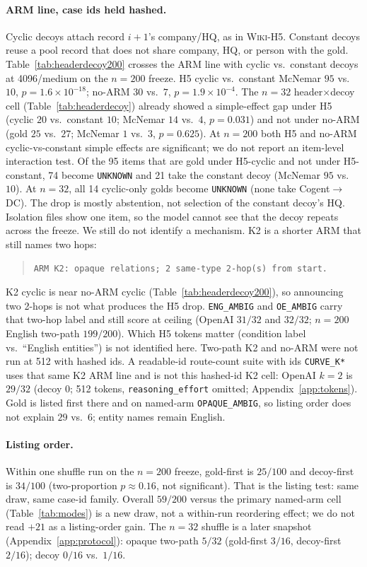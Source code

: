 \documentclass[10pt]{article} %
\begin{document}
\paragraph{ARM line, case ids held hashed.}
Cyclic decoys attach record $i{+}1$'s company/HQ, as in \textsc{Wiki-H5}.
Constant decoys reuse a pool record that does not share company, HQ, or
person with the gold.
Table~\ref{tab:headerdecoy200} crosses the ARM line with cyclic vs.\
constant decoys at 4096/medium on the $n{=}200$ freeze.
H5 cyclic vs.\ constant McNemar $95$ vs.\ $10$,
$p{=}1.6{\times}10^{-18}$; no-ARM $30$ vs.\ $7$, $p{=}1.9{\times}10^{-4}$.
The $n{=}32$ header$\times$decoy cell (Table~\ref{tab:headerdecoy}) already showed a
simple-effect gap under H5 (cyclic $20$ vs.\ constant $10$; McNemar
$14$ vs.\ $4$, $p{=}0.031$) and not under no-ARM (gold $25$ vs.\ $27$;
McNemar $1$ vs.\ $3$, $p{=}0.625$).
At $n{=}200$ both H5 and no-ARM cyclic-vs-constant simple effects are
significant; we do not report an item-level interaction test.
Of the 95 items that are gold under H5-cyclic and not under H5-constant,
74 become \texttt{UNKNOWN} and 21 take the constant decoy
(McNemar $95$ vs.\ $10$).
At $n{=}32$, all 14 cyclic-only golds become \texttt{UNKNOWN} (none take
Cogent$\to$DC).
The drop is mostly abstention, not selection of the constant decoy's HQ.
Isolation files show one item, so the model cannot see that the decoy
repeats across the freeze.
We still do not identify a mechanism.
K2 is a shorter ARM that still names two hops:
\begin{quote}
\small
\texttt{ARM K2: opaque relations; 2 same-type 2-hop(s) from start.}
\end{quote}
K2 cyclic is near no-ARM cyclic
(Table~\ref{tab:headerdecoy200}), so announcing two 2-hops is not what
produces the H5 drop.
\texttt{ENG\_AMBIG} and \texttt{OE\_AMBIG} carry that two-hop label and
still score at ceiling (OpenAI $31/32$ and $32/32$; $n{=}200$ English
two-path $199/200$).
Which H5 tokens matter (condition label vs.\
``English entities'') is not identified here.
Two-path K2 and no-ARM were not run at 512 with hashed ids.
A readable-id route-count suite with ids \texttt{CURVE\_K*} uses that same K2
ARM line and is not this hashed-id K2 cell: OpenAI $k{=}2$ is $29/32$
(decoy $0$; 512 tokens, \texttt{reasoning\_effort} omitted;
Appendix~\ref{app:tokens}).
Gold is listed first there and on named-arm \texttt{OPAQUE\_AMBIG}, so
listing order does not explain $29$ vs.\ $6$; entity names remain English.

\paragraph{Listing order.}
Within one shuffle run on the $n{=}200$ freeze, gold-first is $25/100$ and
decoy-first is $34/100$ (two-proportion $p{\approx}0.16$, not significant).
That is the listing test: same draw, same case-id family.
Overall $59/200$ versus the primary named-arm cell (Table~\ref{tab:modes}) is a new draw,
not a within-run reordering effect; we do not read ${+}21$ as a listing-order gain.
The $n{=}32$ shuffle is a later snapshot
(Appendix~\ref{app:protocol}): opaque two-path $5/32$
(gold-first $3/16$, decoy-first $2/16$); decoy $0/16$ vs.\ $1/16$.
\end{document}
